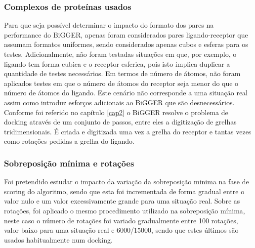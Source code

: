 \subsubsection{Complexos de proteínas usados}
Para que seja possível determinar o impacto do formato dos pares na performance do BiGGER, apenas foram considerados pares ligando-receptor que assumam formatos uniformes, sendo considerados apenas cubos e esferas para os testes. Adicionalmente, não foram testadas situações em que, por exemplo, o ligando tem forma cubica e o receptor esferica, pois isto implica duplicar a quantidade de testes necessários. Em termos de número de átomos, não foram aplicados testes em que o número de átomos do receptor seja menor do que  o número de átomos do ligando. Este cenário não corresponde a uma situação real assim como introduz esforços adicionais ao BiGGER que são desnecessários. Conforme foi referido no capítulo \ref{cap2} o BiGGER resolve o problema de docking através de um conjunto de passos, entre eles a digitização de grelhas tridimensionais. É criada e digitizada uma vez a grelha do receptor e tantas vezes como rotações pedidas a grelha do ligando.
\subsubsection{Sobreposição mínima e rotações}
Foi pretendido estudar o impacto da variação da sobreposição minima na fase de scoring do algoritmo, sendo que esta foi incrementada de forma gradual entre o valor nulo e um valor excessivamente grande para uma situação real. Sobre as rotações, foi aplicado o mesmo procedimento utilizado na sobreposição mínima, neste caso o número de rotações foi variado gradualmente entre 100 rotações, valor baixo para uma situação real e 6000/15000, sendo que estes últimos são usados habitualmente num docking.

